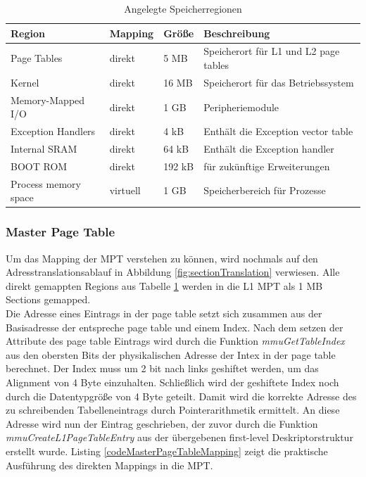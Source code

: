 \begin{table}[H]
\begin{tabular}{p{4cm} | p{1.5cm} | p{1.5cm} | p{6cm}}
  \textbf{Region} & \textbf{Mapping} & \textbf{Größe} & \textbf{Beschreibung} \\ \hline
  Page Tables & direkt & 5 MB & Speicherort für L1 und L2 page tables\\
  Kernel & direkt & 16 MB & Speicherort für das Betriebssystem\\
  Memory-Mapped I/O & direkt &  1 GB & Peripheriemodule\\
  Exception Handlers & direkt &  4 kB & Enthält die Exception vector table\\
  Internal SRAM & direkt & 64 kB & Enthält die Exception handler\\
  BOOT ROM & direkt & 192 kB & für zukünftige Erweiterungen \\ 
  Process memory space & virtuell & 1 GB & Speicherbereich für Prozesse
 \end{tabular}
 \caption{Angelegte Speicherregionen}
 \label{table:MemoryRegions}
\end{table}


\subsubsection{Master Page Table}

Um das Mapping der \ac{MPT} verstehen zu können, wird nochmals auf den Adresstranslationsablauf in Abbildung \ref{fig:sectionTranslation} verwiesen. Alle direkt gemappten Regions aus Tabelle \ref{table:MemoryRegions} werden in die L1 \ac{MPT} als 1 MB Sections gemapped.\\

Die Adresse eines Eintrags in der page table setzt sich zusammen aus der Basisadresse der entspreche page table und einem Index. Nach dem setzen der Attribute des page table Eintrags wird durch die Funktion \emph{mmuGetTableIndex} aus den obersten Bits der physikalischen Adresse der Intex in der page table berechnet. Der Index muss um 2 bit nach links geshiftet werden, um das Alignment von 4 Byte einzuhalten. Schließlich wird der geshiftete Index noch durch die Datentypgröße von 4 Byte geteilt. Damit wird die korrekte Adresse des zu schreibenden Tabelleneintrags durch Pointerarithmetik ermittelt. An diese Adresse wird nun der Eintrag geschrieben, der zuvor durch die Funktion \emph{mmuCreateL1PageTableEntry} aus der übergebenen first-level Deskriptorstruktur erstellt wurde. Listing \ref{codeMasterPageTableMapping} zeigt die praktische Ausführung des direkten Mappings in die \ac{MPT}.\\ 


